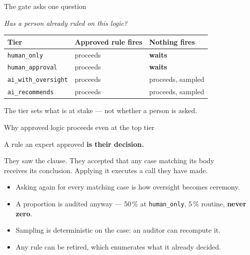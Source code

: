 \documentclass[aspectratio=169,11pt]{beamer}
\begin{document}
\begin{frame}{The gate asks one question}
  \vspace{.7em}
  \begin{center}\large\emph{Has a person already ruled on this logic?}\end{center}
  \vspace{.9em}
  \begin{center}
  \begin{tabular}{lll}
    \toprule
    \textbf{Tier} & \textbf{Approved rule fires} & \textbf{Nothing fires} \\
    \midrule
    \texttt{human\_only}         & proceeds & \textbf{\color{brick}waits} \\
    \texttt{human\_approval}     & proceeds & \textbf{\color{brick}waits} \\
    \texttt{ai\_with\_oversight} & proceeds & proceeds, sampled \\
    \texttt{ai\_recommends}      & proceeds & proceeds, sampled \\
    \bottomrule
  \end{tabular}
  \end{center}
  \vspace{1em}
  \pause
  \begin{center}\color{muted}
    The tier sets what is at stake --- not whether a person is asked.
  \end{center}
\end{frame}

\begin{frame}{Why approved logic proceeds even at the top tier}
  \vspace{1.2em}
  \begin{center}{\Large A rule an expert approved \textbf{is their decision.}}\end{center}
  \vspace{1em}
  \begin{center}
    They saw the clause. They accepted that any case matching its body\\
    receives its conclusion. Applying it executes a call they have made.
  \end{center}
  \vspace{1.4em}
  \pause
  \begin{itemize}\setlength\itemsep{.5em}
    \item Asking again for every matching case is how oversight becomes ceremony.
    \item A proportion is audited anyway --- 50\,\% at \texttt{human\_only},
      5\,\% routine, \textbf{never zero}.
    \item Sampling is deterministic on the case: an auditor can recompute it.
    \item Any rule can be retired, which enumerates what it already decided.
  \end{itemize}
\end{frame}
\end{document}
